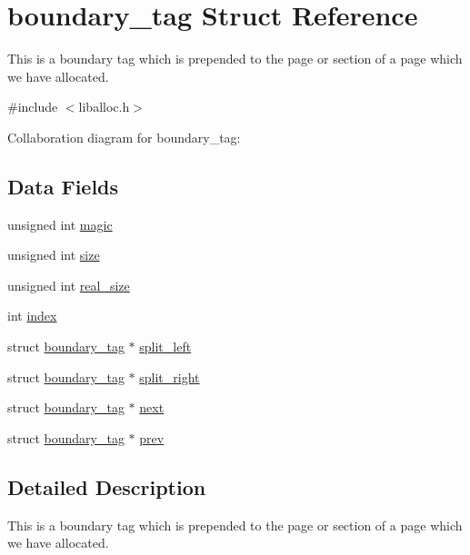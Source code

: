 \hypertarget{a00095}{}\section{boundary\+\_\+tag Struct Reference}
\label{a00095}


This is a boundary tag which is prepended to the page or section of a page which we have allocated.  




{\ttfamily \#include $<$liballoc.\+h$>$}



Collaboration diagram for boundary\+\_\+tag\+:
\subsection*{Data Fields}
\begin{DoxyCompactItemize}
\item 
unsigned int \hyperlink{a00095_a96a8bec3c60c81b8c41239169ec70b6c_a96a8bec3c60c81b8c41239169ec70b6c}{magic}
\item 
unsigned int \hyperlink{a00095_a29b056a39f6022d32468e7913e6df936_a29b056a39f6022d32468e7913e6df936}{size}
\item 
unsigned int \hyperlink{a00095_ad22b1c69bdce419783ac165f7f354245_ad22b1c69bdce419783ac165f7f354245}{real\+\_\+size}
\item 
int \hyperlink{a00095_adfc426eed5361508d62c6e8f484bd270_adfc426eed5361508d62c6e8f484bd270}{index}
\item 
struct \hyperlink{a00095}{boundary\+\_\+tag} $\ast$ \hyperlink{a00095_a4daa8c3768359ea8d0f46ef907616cc2_a4daa8c3768359ea8d0f46ef907616cc2}{split\+\_\+left}
\item 
struct \hyperlink{a00095}{boundary\+\_\+tag} $\ast$ \hyperlink{a00095_a9d43c9c4ff5ae35908dcfed0aec1907a_a9d43c9c4ff5ae35908dcfed0aec1907a}{split\+\_\+right}
\item 
struct \hyperlink{a00095}{boundary\+\_\+tag} $\ast$ \hyperlink{a00095_a123f0bd815d7fda9f535b031640662fc_a123f0bd815d7fda9f535b031640662fc}{next}
\item 
struct \hyperlink{a00095}{boundary\+\_\+tag} $\ast$ \hyperlink{a00095_af5e6f310850e847ad873773f9ab8b902_af5e6f310850e847ad873773f9ab8b902}{prev}
\end{DoxyCompactItemize}


\subsection{Detailed Description}
This is a boundary tag which is prepended to the page or section of a page which we have allocated. 

